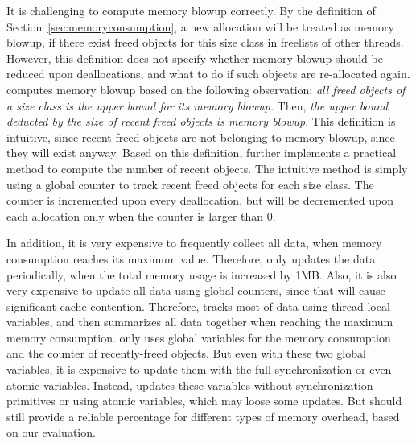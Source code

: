 It is challenging to compute memory blowup correctly. By the definition of Section~\ref{sec:memoryconsumption}, a new allocation will be treated as memory blowup, if there exist freed objects for this size class in freelists of other threads. However, this definition does not specify whether memory blowup should be reduced upon deallocations, and what to do if such objects are re-allocated again. \MP{} computes memory blowup based on the following observation: \textit{all freed objects of a size class is the upper bound for its memory blowup.} Then, \textit{the upper bound deducted by the size of recent freed objects is memory blowup}. This definition is intuitive, since recent freed objects are not belonging to memory blowup, since they will exist anyway. Based on this definition, \MP{} further implements a practical method to compute the number of recent objects. The intuitive method is simply using a global counter to track recent freed objects for each size class. The counter is incremented upon every deallocation, but will be decremented upon each allocation only when the counter is larger than 0.


In addition, it is very expensive to frequently collect all data, when memory consumption reaches its maximum value. Therefore, \MP{} only updates the data periodically, when the total memory usage is increased by 1MB. Also, it is also very expensive to update all data using global counters, since that will cause significant cache contention. Therefore, \MP{} tracks most of data using thread-local variables, and then summarizes all data together when reaching the maximum memory consumption. \MP{} only uses global variables for the memory consumption and the counter of recently-freed objects. But even with these two global variables, it is expensive to update them with the full synchronization or even atomic variables. Instead, \MP{} updates these variables without synchronization primitives or using atomic variables, which may loose some updates. But \MP{} should still provide a reliable percentage for different types of memory overhead, based on our evaluation.  




